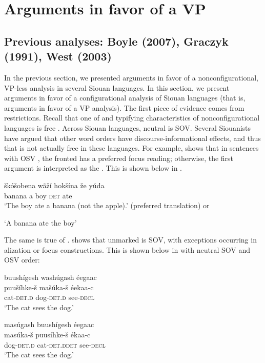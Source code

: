\documentclass[output=paper]{LSP/langsci}
\begin{document}
\section{Arguments in favor of a VP}\label{sec:jrs:3}

\subsection{Previous analyses: Boyle (2007), Graczyk (1991), West (2003)}

In the previous section, we presented arguments in favor of a nonconfigurational, VP-less analysis in several Siouan languages.  In this section, we present arguments in favor of a configurational analysis of Siouan languages (that is, arguments in favor of a VP analysis).  The first piece of evidence comes from  restrictions. Recall that one of  and  typifying characteristics of nonconfigurational languages is free .  Across Siouan languages, neutral  is SOV.  Several Siouanists have argued that other word orders have discourse-informational effects, and thus that  is not actually free in these languages. For example, \citet{West2003} shows that in  sentences with OSV , the fronted  has a preferred focus reading; otherwise, the first argument is interpreted as the . This is shown below in . 

\begin{exe}
\ex\label{ex:jrs:22}	\gll  \v{s}k\'o\v{s}obena w\~a\v{z}\'i 	hok\v{s}\'ina 	\v{z}e 		y\'uda \\
banana 		a 			boy 	\textsc{det} 	ate \\
\trans `The boy ate a banana (not the apple).' (preferred translation) or 

`A banana ate the boy'  \citep[49]{West2003} 
\end{exe}

The same is true of .  \citet{Boyle2007} shows that unmarked  is SOV, with exceptions occurring in alization or focus constructions.  This is shown below in  with neutral SOV  and  OSV order:

\begin{exe}
\ex\label{ex:jrs:23} 
\glll buush\'igesh wash\'ugash \'eegaac\\
puu\v{s}\'ihke-\v{s}  ma\v{s}\'uka-\v{s} \'eekaa-c \\
cat-\textsc{det.d} dog-\textsc{det.d} see-\textsc{decl}  \\
\trans `The cat sees the dog.'  \citep[214]{Boyle2007}

\ex\label{ex:jrs:24} 
\glll mas\'ugash 		buush\'igesh 	\'eegaac\\
mas\'uka-\v{s} 		puus\'ihke-\v{s} 	\'ekaa-c \\
dog-\textsc{det.d} 		cat-\textsc{det.d}\textsc{det}	see-\textsc{decl} \\
\trans `The cat sees the dog.' \citep[214]{Boyle2007}

\end{exe}
	
\end{document}
